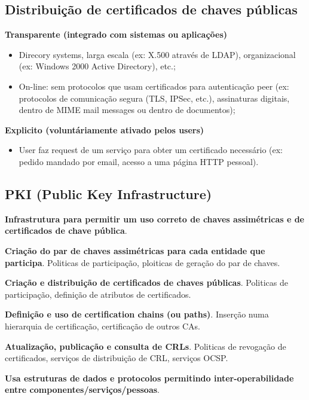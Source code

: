 \documentclass{article}
\begin{document}
\subsection{Distribuição de certificados de chaves públicas}

\begin{flushleft}
  \textbf{Transparente (integrado com sistemas ou aplicações)}
  \begin{itemize}
    \item Direcory systems, larga escala (ex: X.500 através de LDAP),
    organizacional (ex: Windows 2000 Active Directory), etc.;
    \item On-line: sem protocolos que usam certificados
    para autenticação peer (ex: protocolos de comunicação segura
    (TLS, IPSec, etc.), assinaturas digitais, dentro de MIME
    mail messages ou dentro de documentos);
  \end{itemize}

  \vspace{2mm}

  \textbf{Explicito (voluntáriamente ativado pelos users)}
  \begin{itemize}
    \item User faz request de um serviço para obter um certificado
    necessário (ex: pedido mandado por email, acesso a uma página HTTP pessoal).
  \end{itemize}
\end{flushleft}

\subsection{PKI (Public Key Infrastructure)}

\textbf{Infrastrutura para permitir um uso correto de chaves assimétricas e
de certificados de chave pública}.

\begin{flushleft}
  \textbf{Criação do par de chaves assimétricas para cada entidade que participa}.
  Politicas de participação, ploiticas de geração do par de chaves.

  \vspace{2mm}

  \textbf{Criação e distribuição de certificados de chaves públicas}.
  Politicas de participação, definição de atributos de certificados.

  \pagebreak

  \textbf{Definição e uso de certification chains (ou paths)}.
  Inserção numa hierarquia de certificação,
  certificação de outros CAs.

  \vspace{2mm}

  \textbf{Atualização, publicação e consulta de CRLs}.
  Politicas de revogação de certificados,
  serviços de distribuição de CRL, serviços OCSP.

  \vspace{2mm}

  \textbf{Usa estruturas de dados e protocolos permitindo inter-operabilidade
  entre componentes/serviços/pessoas}.
\end{flushleft}
\end{document}
